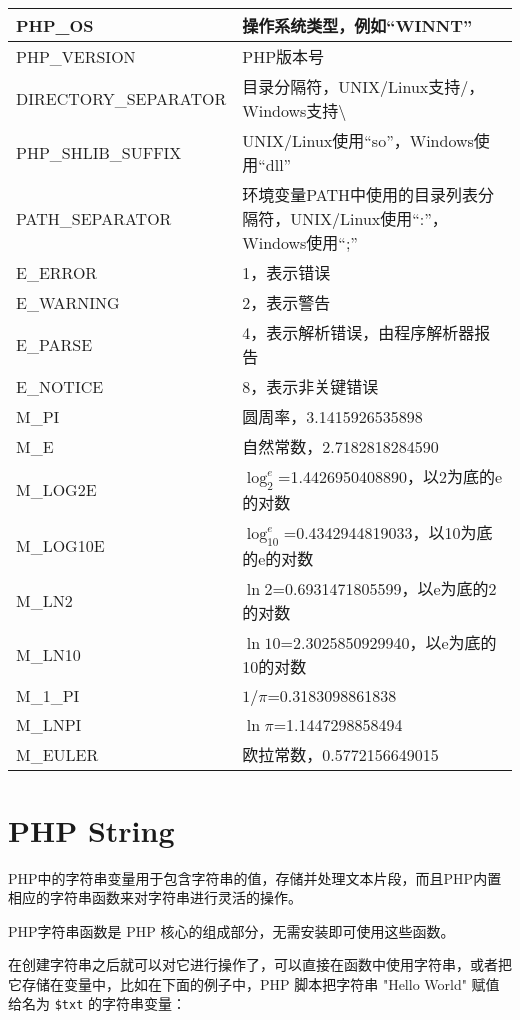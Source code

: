 \begin{longtable}{|p{80pt}|p{300pt}|}
\hline
PHP\_OS & 操作系统类型，例如“WINNT”\\
\hline
PHP\_VERSION & PHP版本号\\
\hline
DIRECTORY\_SEPARATOR&目录分隔符，UNIX/Linux支持/，Windows支持\textbackslash \\
\hline
PHP\_SHLIB\_SUFFIX & UNIX/Linux使用“so”，Windows使用“dll”\\
\hline
PATH\_SEPARATOR & 环境变量PATH中使用的目录列表分隔符，UNIX/Linux使用“:”，Windows使用“;”\\
\hline
E\_ERROR & 1，表示错误\\
\hline
E\_WARNING& 2，表示警告\\
\hline
E\_PARSE & 4，表示解析错误，由程序解析器报告\\
\hline
E\_NOTICE & 8，表示非关键错误\\
\hline
M\_PI & 圆周率，3.1415926535898\\
\hline
M\_E & 自然常数，2.7182818284590\\
\hline
M\_LOG2E & $\log_2^e$=1.4426950408890，以2为底的e的对数\\
\hline
M\_LOG10E & $\log_{10}^e$=0.4342944819033，以10为底的e的对数\\
\hline
M\_LN2&$\ln2$=0.6931471805599，以e为底的2的对数\\
\hline
M\_LN10& $\ln10$=2.3025850929940，以e为底的10的对数\\
\hline
M\_1\_PI&$1/\pi$=0.3183098861838\\
\hline
M\_LNPI&$\ln\pi$=1.1447298858494\\
\hline
M\_EULER&欧拉常数，0.5772156649015\\
\hline
\end{longtable}







\chapter{PHP String}




PHP中的字符串变量用于包含字符串的值，存储并处理文本片段，而且PHP内置相应的字符串函数来对字符串进行灵活的操作。

PHP字符串函数是 PHP 核心的组成部分，无需安装即可使用这些函数。


在创建字符串之后就可以对它进行操作了，可以直接在函数中使用字符串，或者把它存储在变量中，比如在下面的例子中，PHP 脚本把字符串 "Hello World" 赋值给名为 \texttt{\$txt} 的字符串变量：


